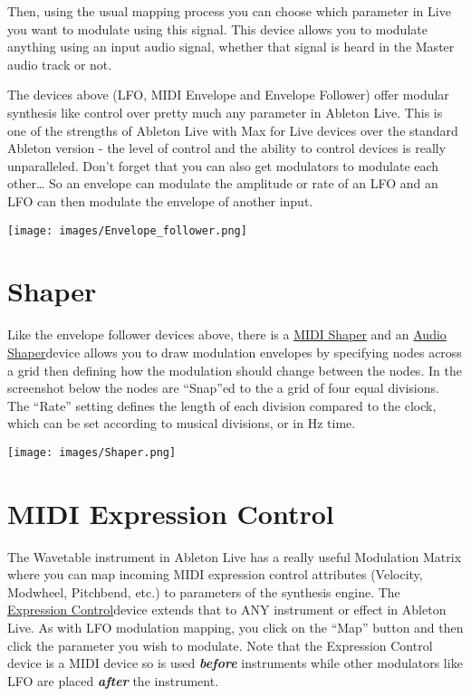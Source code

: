 \documentclass[
  12pt,
  letterpaper,
  oneside,
  open=any]{scrbook}
\begin{document}
Then, using the usual mapping process you can choose which parameter in
Live you want to modulate using this signal. This device allows you to
modulate anything using an input audio signal, whether that signal is
heard in the Master audio track or not.

The devices above (LFO, MIDI Envelope and Envelope Follower) offer
modular synthesis like control over pretty much any parameter in Ableton
Live. This is one of the strengths of Ableton Live with Max for Live
devices over the standard Ableton version - the level of control and the
ability to control devices is really unparalleled. Don't forget that you
can also get modulators to modulate each other\ldots{} So an envelope
can modulate the amplitude or rate of an LFO and an LFO can then
modulate the envelope of another input.

\texttt{[image: images/Envelope\_follower.png]}

\section{Shaper}\label{shaper}

Like the envelope follower devices above, there is a
\href{https://www.ableton.com/en/live-manual/11/max-for-live-devices/\#shaper-midi}{MIDI
Shaper} and an
\href{https://www.ableton.com/en/live-manual/11/max-for-live-devices/\#shaper}{Audio
Shaper}device allows you to draw modulation envelopes by specifying
nodes across a grid then defining how the modulation should change
between the nodes. In the screenshot below the nodes are ``Snap''ed to
the a grid of four equal divisions. The ``Rate'' setting defines the
length of each division compared to the clock, which can be set
according to musical divisions, or in Hz time.

\texttt{[image: images/Shaper.png]}

\section{MIDI Expression Control}\label{midi-expression-control}

The Wavetable instrument in Ableton Live has a really useful Modulation
Matrix where you can map incoming MIDI expression control attributes
(Velocity, Modwheel, Pitchbend, etc.) to parameters of the synthesis
engine. The
\href{https://www.ableton.com/en/live-manual/11/max-for-live-devices/\#expression-control}{Expression
Control}device extends that to ANY instrument or effect in Ableton Live.
As with LFO modulation mapping, you click on the ``Map'' button and then
click the parameter you wish to modulate. Note that the Expression
Control device is a MIDI device so is used \textbf{\emph{before}}
instruments while other modulators like LFO are placed
\textbf{\emph{after}} the instrument.
\end{document}
